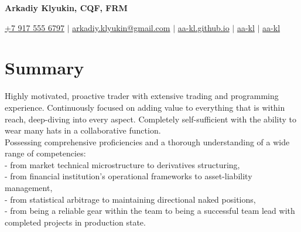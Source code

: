\documentclass[a4paper,hidelinks]{article}
\begin{document}

\begin{center}
  \textbf{\Huge{Arkadiy Klyukin, CQF, FRM}} \\ \vspace{4pt}
  
  \small
  \faMobile \hspace{.5pt} \href{tel:+79175556797}{+7 917 555 6797}
  $|$
  \faAt \hspace{.5pt} \href{mailto:arkadiy.klyukin@gmail.com}{arkadiy.klyukin@gmail.com}
  $|$
  \faGlobe \hspace{.5pt} \href{https://aa-kl.github.io}{aa-kl.github.io}
  $|$
  \faLinkedinSquare \hspace{.5pt} \href{https://www.linkedin.com/in/aa-kl}{aa-kl}
  $|$
  \faGithub \hspace{.5pt} \href{https://github.com/aa-kl}{aa-kl}
\end{center}

\vspace{-15pt}
\section{Summary}
Highly motivated, proactive trader with extensive trading and programming experience. Continuously focused on adding value to everything that is within reach, deep-diving into every aspect. Completely self-sufficient with the ability to wear many hats in a collaborative function.\\
Possessing comprehensive proficiencies and a thorough understanding of a wide range of competencies:\\
- from market technical microstructure to derivatives structuring,\\
- from financial institution's operational frameworks to asset-liability management,\\
- from statistical arbitrage to maintaining directional naked positions,\\
- from being a reliable gear within the team to being a successful team lead with completed projects in production state.\\
\end{document}
